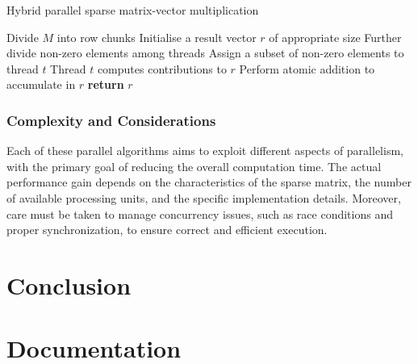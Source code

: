 \documentclass[12pt,oneside]{book} %
\begin{document}
\begin{algorithm}[H]
    \caption{Hybrid parallel sparse matrix-vector multiplication}
    \begin{algorithmic}[1]
        \State Divide $M$ into row chunks
        \State Initialise a result vector $r$ of appropriate size
        \State Further divide non-zero elements among threads
        \State Assign a subset of non-zero elements to thread $t$
        \State Thread $t$ computes contributions to $r$
        \State Perform atomic addition to accumulate in $r$
        \EndFor
        \EndFor
        \State \textbf{return} $r$
        \EndProcedure
    \end{algorithmic}
\end{algorithm}

\subsection*{Complexity and Considerations}

Each of these parallel algorithms aims to exploit different aspects of
parallelism, with the primary goal of reducing the overall computation time.
The actual performance gain depends on the characteristics of the sparse
matrix, the number of available processing units, and the specific
implementation details. Moreover, care must be taken to manage concurrency
issues, such as race conditions and proper synchronization, to ensure correct
and efficient execution.

\newpage
\chapter{Conclusion}




\appendix
\chapter{Documentation}
\end{document}

